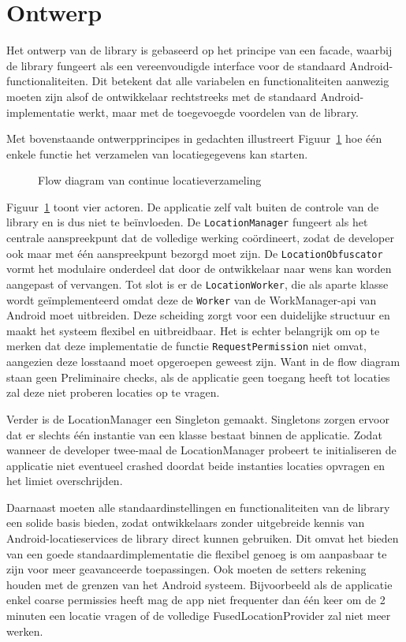\section{Ontwerp}
Het ontwerp van de library is gebaseerd op het principe van een facade, waarbij de library fungeert als een vereenvoudigde interface voor de standaard Android-functionaliteiten. Dit betekent dat alle variabelen en functionaliteiten aanwezig moeten zijn alsof de ontwikkelaar rechtstreeks met de standaard Android-implementatie werkt, maar met de toegevoegde voordelen van de library.

Met bovenstaande ontwerpprincipes in gedachten illustreert Figuur~\ref{fig:flow_diagram_locatie_verzameling} hoe één enkele functie het verzamelen van locatiegegevens kan starten.
\begin{figure}
    \centering
    
    \caption{Flow diagram van continue locatieverzameling}
    \label{fig:flow_diagram_locatie_verzameling}
\end{figure}
Figuur~\ref{fig:flow_diagram_locatie_verzameling} toont vier actoren. De applicatie zelf valt buiten de controle van de library en is dus niet te beïnvloeden. De \texttt{LocationManager} fungeert als het centrale aanspreekpunt dat de volledige werking coördineert, zodat de developer ook maar met één aanspreekpunt bezorgd moet zijn. De \texttt{LocationObfuscator} vormt het modulaire onderdeel dat door de ontwikkelaar naar wens kan worden aangepast of vervangen. Tot slot is er de \texttt{LocationWorker}, die als aparte klasse wordt geïmplementeerd omdat deze de \texttt{Worker} van de WorkManager-\gls{api} van Android moet uitbreiden. Deze scheiding zorgt voor een duidelijke structuur en maakt het systeem flexibel en uitbreidbaar.
Het is echter belangrijk om op te merken dat deze implementatie de functie \texttt{RequestPermission} niet omvat, aangezien deze losstaand moet opgeroepen geweest zijn. Want in de flow diagram staan geen Preliminaire checks, als de applicatie geen toegang heeft tot locaties zal deze niet proberen locaties op te vragen.

Verder is de LocationManager een Singleton \cite{singleton} gemaakt. Singletons zorgen ervoor dat er slechts één instantie van een klasse bestaat binnen de applicatie. Zodat wanneer de developer twee-maal de LocationManager probeert te initialiseren de applicatie niet eventueel crashed doordat beide instanties locaties opvragen en het limiet overschrijden.

Daarnaast moeten alle standaardinstellingen en functionaliteiten van de library een solide basis bieden, zodat ontwikkelaars zonder uitgebreide kennis van Android-locatieservices de library direct kunnen gebruiken. Dit omvat het bieden van een goede standaardimplementatie die flexibel genoeg is om aanpasbaar te zijn voor meer geavanceerde toepassingen. Ook moeten de setters rekening houden met de grenzen van het Android systeem. Bijvoorbeeld als de applicatie enkel coarse permissies heeft mag de app niet frequenter dan één keer om de 2 minuten een locatie vragen of de volledige FusedLocationProvider zal niet meer werken.

